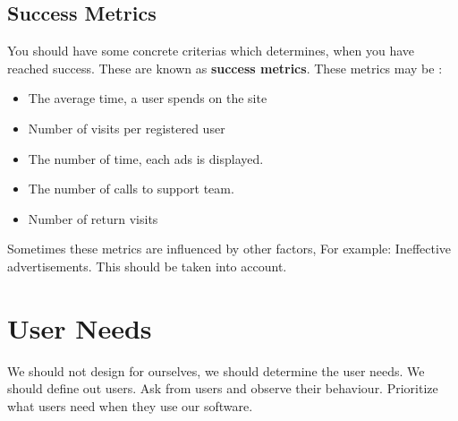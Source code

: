 \subsection{Success Metrics}
    You should have some concrete criterias which determines, when you have reached success. These are known as \textbf{success metrics}. These metrics may be :
    \begin{itemize}
        \item The average time, a user spends on the site
        \item Number of visits per registered user
        \item The number of time, each ads is displayed.
        \item The number of calls to support team.
        \item Number of return visits
    \end{itemize}
    Sometimes these metrics are influenced by other factors, For example: Ineffective advertisements. This should be taken into account.
\section{User Needs}
We should not design for ourselves, we should determine the user needs. We should define out users. Ask from users and observe their behaviour.
Prioritize what users need when they use our software.
